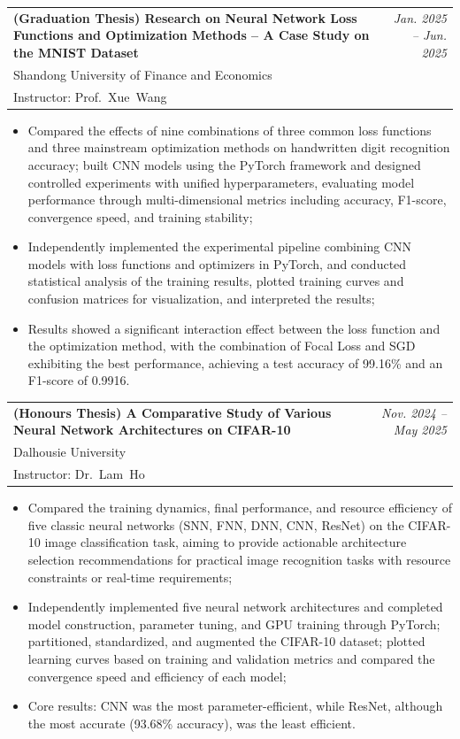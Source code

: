\documentclass[letterpaper,11pt]{article}
\makeatletter
\newcommand{\resumeItem}[1]{
  \item\small{
    {#1 \vspace{-2pt}}
  }
}
\newcommand{\resumeResearchProject}[4]{
  \vspace{-2pt}\item
    \begin{tabular*}{0.97\textwidth}[t]{p{0.65\textwidth}@{\extracolsep{\fill}}r}
      \textbf{#1} & \textit{\small #2} \\
      {\small #3} & \\
      {\small #4} & \\
    \end{tabular*}\vspace{-7pt}
}
\newcommand{\resumeItemListStart}{\begin{itemize}}
\newcommand{\resumeItemListEnd}{\end{itemize}\vspace{-5pt}}
\makeatother
\begin{document}
    \resumeResearchProject
      {(Graduation Thesis) Research on Neural Network Loss Functions and Optimization Methods -- A Case Study on the MNIST Dataset}
      {Jan. 2025 -- Jun. 2025}
      {Shandong University of Finance and Economics}
      {Instructor: Prof.~Xue~Wang}
      \resumeItemListStart
        \resumeItem{Compared the effects of nine combinations of three common loss functions and three mainstream optimization methods on handwritten digit recognition accuracy; built CNN models using the PyTorch framework and designed controlled experiments with unified hyperparameters, evaluating model performance through multi-dimensional metrics including accuracy, F1-score, convergence speed, and training stability;}
        \resumeItem{Independently implemented the experimental pipeline combining CNN models with loss functions and optimizers in PyTorch, and conducted statistical analysis of the training results, plotted training curves and confusion matrices for visualization, and interpreted the results;}
        \resumeItem{Results showed a significant interaction effect between the loss function and the optimization method, with the combination of Focal Loss and SGD exhibiting the best performance, achieving a test accuracy of 99.16\% and an F1-score of 0.9916.}
      \resumeItemListEnd

    \resumeResearchProject
      {(Honours Thesis) A Comparative Study of Various Neural Network Architectures on CIFAR-10}
      {Nov. 2024 -- May 2025}
      {Dalhousie University}
      {Instructor: Dr.~Lam~Ho}
      \resumeItemListStart
        \resumeItem{Compared the training dynamics, final performance, and resource efficiency of five classic neural networks (SNN, FNN, DNN, CNN, ResNet) on the CIFAR-10 image classification task, aiming to provide actionable architecture selection recommendations for practical image recognition tasks with resource constraints or real-time requirements;}
        \resumeItem{Independently implemented five neural network architectures and completed model construction, parameter tuning, and GPU training through PyTorch; partitioned, standardized, and augmented the CIFAR-10 dataset; plotted learning curves based on training and validation metrics and compared the convergence speed and efficiency of each model;}
        \resumeItem{Core results: CNN was the most parameter-efficient, while ResNet, although the most accurate (93.68\% accuracy), was the least efficient.}
      \resumeItemListEnd
\end{document}
